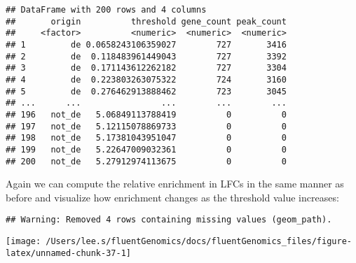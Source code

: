 \documentclass[
  9pt,
  a4paper,
]{extarticle}
\newenvironment{Shaded}{\begin{snugshade}}{\end{snugshade}}
\newcommand{\DataTypeTok}[1]{\textcolor[rgb]{0.13,0.29,0.53}{#1}}
\newcommand{\KeywordTok}[1]{\textcolor[rgb]{0.13,0.29,0.53}{\textbf{#1}}}
\newcommand{\NormalTok}[1]{#1}
\newcommand{\OperatorTok}[1]{\textcolor[rgb]{0.81,0.36,0.00}{\textbf{#1}}}
\newcommand{\StringTok}[1]{\textcolor[rgb]{0.31,0.60,0.02}{#1}}
\begin{document}
\begin{verbatim}
## DataFrame with 200 rows and 4 columns
##       origin          threshold gene_count peak_count
##     <factor>          <numeric>  <numeric>  <numeric>
## 1         de 0.0658243106359027        727       3416
## 2         de  0.118483961449043        727       3392
## 3         de  0.171143612262182        727       3304
## 4         de  0.223803263075322        724       3160
## 5         de  0.276462913888462        723       3045
## ...      ...                ...        ...        ...
## 196   not_de   5.06849113788419          0          0
## 197   not_de   5.12115078869733          0          0
## 198   not_de   5.17381043951047          0          0
## 199   not_de   5.22647009032361          0          0
## 200   not_de   5.27912974113675          0          0
\end{verbatim}

Again we can compute the relative enrichment in LFCs in the same manner as
before and visualize how enrichment changes as the threshold value increases:

\begin{Shaded}
\end{Shaded}

\begin{verbatim}
## Warning: Removed 4 rows containing missing values (geom_path).
\end{verbatim}

\begin{center}\texttt{[image: /Users/lee.s/fluentGenomics/docs/fluentGenomics\_files/figure-latex/unnamed-chunk-37-1]} \end{center}
\end{document}
